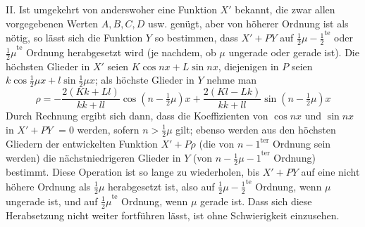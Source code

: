 II. Ist umgekehrt von anderswoher eine Funktion \(X'\) bekannt, die zwar allen vorgegebenen Werten \(A,B,C,D\) usw. genügt, aber von höherer Ordnung ist als nötig, so lässt sich die Funktion \(Y\) so bestimmen, dass \(X'+PY\) auf \({\frac{1}{2}\mu-\frac{1}{2}}^{\mathrm{te}}\) oder \({\frac{1}{2}\mu}^{\mathrm{te}}\) Ordnung herabgesetzt wird (je nachdem, ob \(\mu\) ungerade oder gerade ist). Die höchsten Glieder in \(X'\) seien \(K\cos nx+L\sin nx\), diejenigen in \(P\) seien \(k\cos\frac{1}{2}\mu x+l\sin\frac{1}{2}\mu x\); als höchste Glieder in \(Y\) nehme man
\[
\rho=-\frac{2(Kk+Ll)}{kk+ll}\cos(n-\tfrac{1}{2}\mu)x
     +\frac{2(Kl-Lk)}{kk+ll}\sin(n-\tfrac{1}{2}\mu)x
\]
Durch Rechnung ergibt sich dann, dass die Koeffizienten von \(\cos nx\) und \(\sin nx\) in \(X'+PY\) \(=0\) werden, sofern \(n>\frac{1}{2}\mu\) gilt; ebenso werden aus den höchsten Gliedern der entwickelten Funktion \(X'+P\rho\) (die von \({n-1}^{\mathrm{ter}}\) Ordnung sein werden) die nächstniedrigeren Glieder in \(Y\) (von \({n-\frac{1}{2}\mu-1}^{\mathrm{ter}}\) Ordnung) bestimmt. Diese Operation ist so lange zu wiederholen, bis \(X'+PY\) auf eine nicht höhere Ordnung als \(\frac{1}{2}\mu\) herabgesetzt ist, also auf \({\frac{1}{2}\mu-\frac{1}{2}}^{\mathrm{te}}\) Ordnung, wenn \(\mu\) ungerade ist, und auf \({\frac{1}{2}\mu}^{\mathrm{te}}\) Ordnung, wenn \(\mu\) gerade ist. Dass sich diese Herabsetzung nicht weiter fortführen lässt, ist ohne Schwierigkeit einzusehen.

